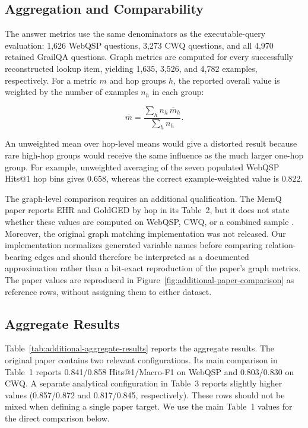 \subsection{Aggregation and Comparability}
\label{app:additional-aggregation}

The answer metrics use the same denominators as the executable-query
evaluation: 1,626 WebQSP questions, 3,273 CWQ questions, and all 4,970 retained
GrailQA questions. Graph metrics are computed for every successfully
reconstructed lookup item, yielding 1,635, 3,526, and 4,782 examples,
respectively. For a metric $m$ and hop groups $h$, the reported overall value
is weighted by the number of examples $n_h$ in each group:

\begin{equation}
    \overline{m}
    = \frac{\sum_h n_h\,\overline{m}_h}{\sum_h n_h}.
    \label{eq:weighted-hop-average}
\end{equation}

An unweighted mean over hop-level means would give a distorted result because
rare high-hop groups would receive the same influence as the much larger
one-hop group. For example, unweighted averaging of the seven populated
WebQSP Hits@1 hop bins gives 0.658, whereas the correct example-weighted value
is 0.822.

The graph-level comparison requires an additional qualification. The MemQ
paper reports EHR and GoldGED by hop in its Table~2, but it does not state
whether these values are computed on WebQSP, CWQ, or a combined sample
\cite{xuMemoryaugmentedQueryReconstruction2025}. Moreover, the original graph
matching implementation was not released. Our implementation normalizes
generated variable names before comparing relation-bearing edges and should
therefore be interpreted as a documented approximation rather than a bit-exact
reproduction of the paper's graph metrics. The paper values are reproduced in
Figure~\ref{fig:additional-paper-comparison} as reference rows, without
assigning them to either dataset.

\subsection{Aggregate Results}
\label{app:additional-results}

Table~\ref{tab:additional-aggregate-results} reports the aggregate results.
The original paper contains two relevant configurations. Its main comparison
in Table~1 reports 0.841/0.858 Hits@1/Macro-F1 on WebQSP and 0.803/0.830 on
CWQ. A separate analytical configuration in Table~3 reports slightly higher
values (0.857/0.872 and 0.817/0.845, respectively). These rows should not be
mixed when defining a single paper target. We use the main Table~1 values for
the direct comparison below.

